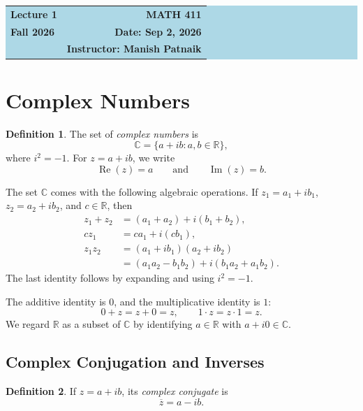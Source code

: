 \documentclass[11pt]{article}
\theoremstyle{definition}
\newtheorem{definition}{Definition}
\theoremstyle{remark}
\newcommand{\C}{\mathbb{C}}
\newcommand{\R}{\mathbb{R}}
\newcommand{\RePart}{\operatorname{Re}}
\newcommand{\ImPart}{\operatorname{Im}}
\begin{document}
\begin{center}
  \colorbox{lightblue}{%
    \begin{minipage}{0.94\textwidth}
      \vspace{0.55em}
      \begin{tabular*}{\textwidth}{@{\extracolsep{\fill}}lr}
        {\color{courseblue}\bfseries\LARGE Lecture 1} &
        {\color{courseblue}\bfseries\LARGE MATH 411}\\[0.35em]
        \textbf{Fall 2026} & \textbf{Date: Sep 2, 2026}\\
        & \textbf{Instructor: Manish Patnaik}
      \end{tabular*}
      \vspace{0.45em}
    \end{minipage}}
\end{center}

\section{Complex Numbers}

\begin{definition}
The set of \emph{complex numbers} is
\[
  \C=\{a+ib : a,b\in\R\},
\]
where $i^2=-1$.  For $z=a+ib$, we write
\[
  \RePart(z)=a \qquad\text{and}\qquad \ImPart(z)=b.
\]
\end{definition}

The set $\C$ comes with the following algebraic operations.  If
$z_1=a_1+ib_1$, $z_2=a_2+ib_2$, and $c\in\R$, then
\begin{align*}
  z_1+z_2
    &= (a_1+a_2)+i(b_1+b_2),\\
  c z_1
    &= ca_1+i(cb_1),\\
  z_1z_2
    &= (a_1+ib_1)(a_2+ib_2)\\
    &= (a_1a_2-b_1b_2)+i(b_1a_2+a_1b_2).
\end{align*}
The last identity follows by expanding and using $i^2=-1$.

The additive identity is $0$, and the multiplicative identity is $1$:
\[
  0+z=z+0=z,
  \qquad
  1\cdot z=z\cdot 1=z.
\]
We regard $\R$ as a subset of $\C$ by identifying $a\in\R$ with
$a+i0\in\C$.

\subsection{Complex Conjugation and Inverses}

\begin{definition}
If $z=a+ib$, its \emph{complex conjugate} is
\[
  \overline{z}=a-ib.
\]
\end{definition}
\end{document}
